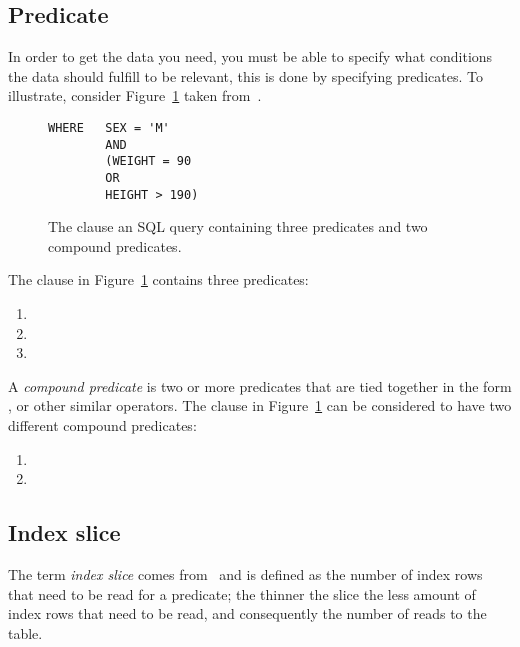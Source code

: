 \subsection*{Predicate}
In order to get the data you need, you must be able to specify what conditions the data should fulfill to be relevant, this is done by specifying predicates. To illustrate, consider Figure~\ref{fig:sql:predicate} taken from~\cite{lahdenmaki_2005_relational_rdidatodossea}.

\begin{figure}[ht]
\begin{verbatim}
WHERE   SEX = 'M'
        AND
        (WEIGHT = 90
        OR
        HEIGHT > 190)
\end{verbatim}
\caption[The  clause of a query containing three predicates and two compound predicates]{The  clause an SQL query containing three predicates and two compound predicates.}\label{fig:sql:predicate}
\end{figure}

The  clause in Figure~\ref{fig:sql:predicate} contains three predicates:
\begin{enumerate}
    \item {}
    \item {}
    \item {}
\end{enumerate}

A \textit{compound predicate} is two or more predicates that are tied together in the form ,  or other similar operators. The  clause in Figure~\ref{fig:sql:predicate} can be considered to have two different compound predicates:
\begin{enumerate}
    \item {}
    \item {}
\end{enumerate}

\subsection*{Index slice}
The term \textit{index slice} comes from~\cite{lahdenmaki_2005_relational_rdidatodossea} and is defined as the number of index rows that need to be read for a predicate; the thinner the slice the less amount of index rows that need to be read, and consequently the number of reads to the table.

